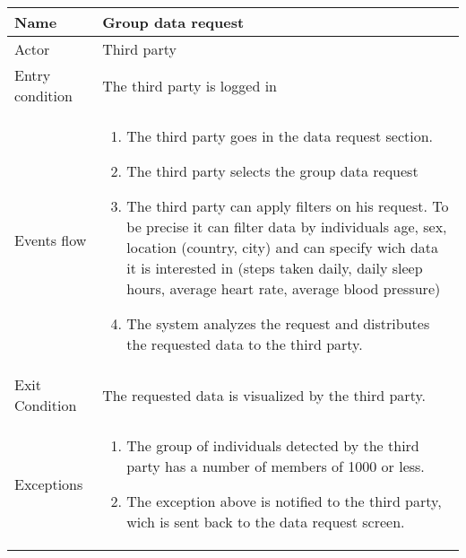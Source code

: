 \begin{tabular}{|l|p{13cm}|}
    \hline
    Name & Group data request
    \\ \hline
    Actor & Third party
    \\ \hline 
    Entry condition & The third party is logged in
        \\ \hline
    Events flow &
    \begin{enumerate}
    \item The third party goes in the data request section.
    \item The third party selects the group data request
	\item The third party can apply filters on his request. To be precise it can filter data by individuals age, sex, location (country, city) and can specify wich data it is interested in (steps taken daily, daily sleep hours, average heart rate, average blood pressure)
	\item The system analyzes the request and distributes the requested data to the third party.
    \end{enumerate}
     \\ \hline
     Exit Condition & The requested data is visualized by the third party.
     \\
    \hline
    Exceptions &
        \begin{enumerate}
    \item The group of individuals detected by the third party has a number of members of 1000 or less.
    \item The exception above is notified to the third party, wich is sent back to the data request screen.
     
    \end{enumerate}
	 \\
    \hline
\end{tabular}



